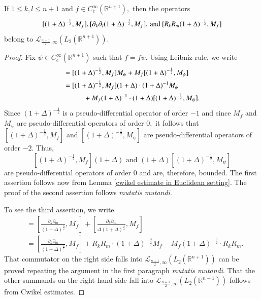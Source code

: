\documentclass[12pt]{amsart}
\begin{document}
\begin{lemma}\label{iii verification first lemma} If $1\leq k,l\leq n+1$ and $f\in C^{\infty}_c(\mathbb{R}^{n+1}),$ then the operators
$$[(1+\Delta)^{-\frac12},M_f],[\partial_k\partial_l(1+\Delta)^{-\frac32},M_f],\,{\rm and}\ [R_kR_m(1+\Delta)^{-\frac12},M_{f}]$$
belong to $\mathcal{L}_{\frac{n+1}{2},\infty}(L_2(\mathbb{R}^{n+1}))$.
\end{lemma}
\begin{proof} Fix $\psi\in C^{\infty}_c(\mathbb{R}^{n+1})$ such that $f=f\psi.$ Using Leibniz rule, we write
\begin{align*}
[(1+\Delta)^{-\frac12},M_f]
&=[(1+\Delta)^{-\frac12},M_{f}]M_{\psi}+M_{f}[(1+\Delta)^{-\frac12},M_{\psi}]\\
&=[(1+\Delta)^{-\frac12},M_{f}](1+\Delta)\cdot (1+\Delta)^{-1}M_{\psi}\\
&\hspace{1.0cm}+M_{f}(1+\Delta)^{-1}\cdot (1+\Delta)[(1+\Delta)^{-\frac12},M_{\psi}].
\end{align*}
Since $(1+\Delta)^{-\frac12}$ is a pseudo-differential operator of order $-1$ and since $M_{f}$ and $M_{\psi}$ are pseudo-differential operators of order $0,$ it follows that $[(1+\Delta)^{-\frac12},M_{f}]$ and $[(1+\Delta)^{-\frac12},M_{\psi}]$ are pseudo-differential operators of order $-2.$ Thus,
$$[(1+\Delta)^{-\frac12},M_{f}](1+\Delta)\mbox{ and }(1+\Delta)[(1+\Delta)^{-\frac12},M_{\psi}]$$
are pseudo-differential operators of order $0$ and are, therefore, bounded. The first assertion follows now from Lemma \ref{cwikel estimate in Euclidean setting}. The proof of the second assertion follows {\it mutatis mutandi}.

To see the third assertion, we write
\begin{align*}
[R_kR_m(1+\Delta)^{-\frac12},M_{f}]
&=[\frac{\partial_k\partial_m}{(1+\Delta)^{\frac32}},M_f]+[\frac{\partial_k\partial_m}{\Delta(1+\Delta)^{\frac32}},M_f]\\
&=[\frac{\partial_k\partial_m}{(1+\Delta)^{\frac32}},M_f]+R_kR_m\cdot (1+\Delta)^{-\frac32}M_f-M_f(1+\Delta)^{-\frac32}\cdot R_kR_m.
\end{align*}
That commutator on the right side falls into $\mathcal{L}_{\frac{n+1}{2},\infty}(L_2(\mathbb{R}^{n+1}))$ can be proved repeating the argument in the first paragraph {\it mutatis mutandi}. That the other summands on the right hand side fall into $\mathcal{L}_{\frac{n+1}{2},\infty}(L_2(\mathbb{R}^{n+1}))$ follows from Cwikel estimates.
\end{proof}
\end{document}
